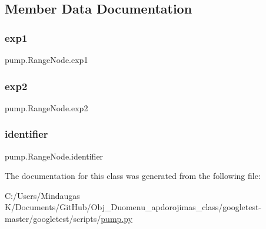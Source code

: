 \subsection{Member Data Documentation}
\mbox{\label{classpump_1_1_range_node_acbb59f8c5e23d23563ca03f21574ce63}} 
\subsubsection{\texorpdfstring{exp1}{exp1}}
{\footnotesize\ttfamily pump.\+Range\+Node.\+exp1}

\mbox{\label{classpump_1_1_range_node_afe153ee472b121652a51c62c1522cc13}} 
\subsubsection{\texorpdfstring{exp2}{exp2}}
{\footnotesize\ttfamily pump.\+Range\+Node.\+exp2}

\mbox{\label{classpump_1_1_range_node_ae75b9f31ba8c3bd048cf09b22035efa0}} 
\subsubsection{\texorpdfstring{identifier}{identifier}}
{\footnotesize\ttfamily pump.\+Range\+Node.\+identifier}



The documentation for this class was generated from the following file\+:\begin{DoxyCompactItemize}
\item 
C\+:/\+Users/\+Mindaugas K/\+Documents/\+Git\+Hub/\+Obj\+\_\+\+Duomenu\+\_\+apdorojimas\+\_\+class/googletest-\/master/googletest/scripts/\mbox{\hyperlink{googletest-master_2googletest_2scripts_2pump_8py}{pump.\+py}}\end{DoxyCompactItemize}
